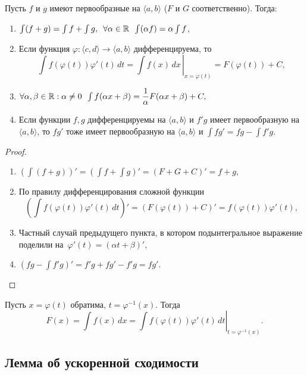 \begin{ntheorem} \hypertarget{t1_2}{}
	Пусть \(f\) и \(g\) имеют первообразные на \(\langle a, b \rangle\) (\(F\) и \(G\) соответственно). Тогда:
	\begin{enumerate}
		\item \(\int (f + g) = \int f + \int g, \enskip \forall \alpha \in \mathbb{R} \enskip \int (\alpha f) = \alpha \int f\),
		\item Если функция \(\varphi \colon \langle c, d \rangle \to \langle a, b \rangle\) дифференцируема, то \[
		\int f(\varphi(t)) \varphi'(t) \, dt = \left. \int f(x) \, dx \, \right|_{x=\varphi(t)} = F(\varphi(t)) + C,
		\]
		\item \(\forall \alpha, \beta \in \mathbb{R} : \alpha \neq 0 \enskip \int f(\alpha x + \beta) = \dfrac1\alpha F(\alpha x + \beta) + C,\) 
		\item Если функции \(f, g\) дифференцируемы на \(\langle a, b \rangle\) и \(f'g\) имеет первообразную на \(\langle a, b \rangle\), то \(fg'\) тоже имеет первообразную на \(\langle a, b \rangle\) и \(\int fg' = fg - \int f'g\).
	\end{enumerate}
\end{ntheorem}
\begin{proof}
	\begin{enumerate}
		\item \(\left(\int (f + g) \right)' = \left(\int f + \int g \right)' = (F + G + C)' = f + g\),
		\item По правилу дифференцирования сложной функции \[
		\left(\int f(\varphi(t)) \varphi'(t) \, dt \right)' = (F(\varphi(t)) + C )' = f(\varphi(t)) \varphi'(t),
		\]
		\item Частный случай предыдущего пункта, в котором подынтегральное выражение поделили на~\(\varphi'(t) = (\alpha t + \beta)'\),
		\item \(\left(fg - \int f'g \right)' = f'g + fg' - f'g = fg'\).
	\end{enumerate}
\end{proof}

\begin{remark}
	Пусть $x = \varphi(t)$ обратима, $t = \varphi^{-1}(x)$. Тогда \[
		F(x) = \int f(x) \, dx = \left. \int f(\varphi(t)) \varphi'(t) \, dt \right|_{t=\varphi^{-1}(x)}.
	\]
\end{remark}

\subsection{Лемма об ускоренной сходимости}

